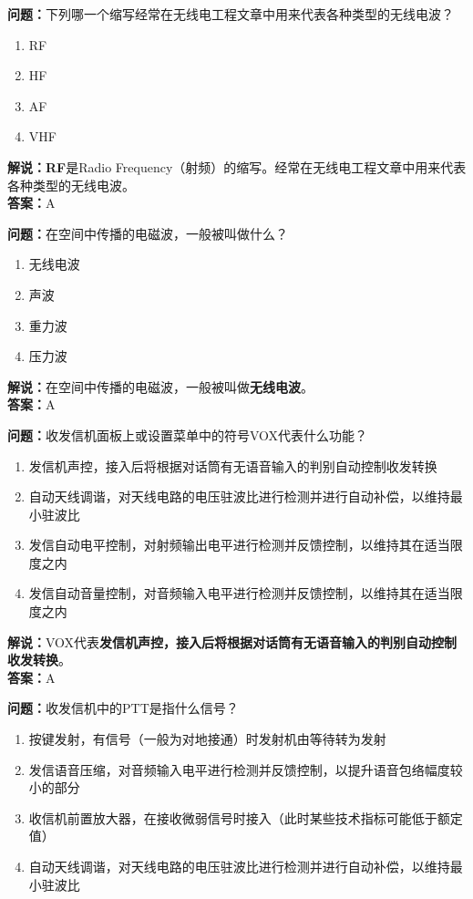 \textbf{问题：}下列哪一个缩写经常在无线电工程文章中用来代表各种类型的无线电波？

\begin{enumerate}[label=\Alph*), leftmargin=1cm]
	\item RF
	\item HF
	\item AF
	\item VHF
\end{enumerate}

\textbf{解说：RF}是Radio Frequency（射频）的缩写。经常在无线电工程文章中用来代表各种类型的无线电波。\\\textbf{答案：}A



\textbf{问题：}在空间中传播的电磁波，一般被叫做什么？

\begin{enumerate}[label=\Alph*), leftmargin=1cm]
	\item 无线电波
	\item 声波
	\item 重力波
	\item 压力波
\end{enumerate}

\textbf{解说：}在空间中传播的电磁波，一般被叫做\textbf{无线电波}。\\\textbf{答案：}A%



\textbf{问题：}收发信机面板上或设置菜单中的符号VOX代表什么功能？

\begin{enumerate}[label=\Alph*), leftmargin=1cm]
	\item 发信机声控，接入后将根据对话筒有无语音输入的判别自动控制收发转换
	\item 自动天线调谐，对天线电路的电压驻波比进行检测并进行自动补偿，以维持最小驻波比
	\item 发信自动电平控制，对射频输出电平进行检测并反馈控制，以维持其在适当限度之内
	\item 发信自动音量控制，对音频输入电平进行检测并反馈控制，以维持其在适当限度之内
\end{enumerate}

\textbf{解说：}VOX代表\textbf{发信机声控，接入后将根据对话筒有无语音输入的判别自动控制收发转换}。\\\textbf{答案：}A%



\textbf{问题：}收发信机中的PTT是指什么信号？

\begin{enumerate}[label=\Alph*), leftmargin=1cm]
	\item 按键发射，有信号（一般为对地接通）时发射机由等待转为发射
	\item 发信语音压缩，对音频输入电平进行检测并反馈控制，以提升语音包络幅度较小的部分
	\item 收信机前置放大器，在接收微弱信号时接入（此时某些技术指标可能低于额定值）
	\item 自动天线调谐，对天线电路的电压驻波比进行检测并进行自动补偿，以维持最小驻波比
\end{enumerate}

